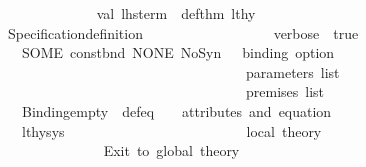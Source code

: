 \begin{isabellebody}
\ \ \ \ \ \ \ \ \ \ \ \ \ \ \isanewline
\ \ \ \ \ \ \ \ \ \ \ \ \ \ val\ {\isacharparenleft}{\kern0pt}{\isacharparenleft}{\kern0pt}lhs{\isacharunderscore}{\kern0pt}term{\isacharcomma}{\kern0pt}\ {\isacharparenleft}{\kern0pt}{\isacharunderscore}{\kern0pt}{\isacharcomma}{\kern0pt}\ def{\isacharunderscore}{\kern0pt}thm{\isacharparenright}{\kern0pt}{\isacharparenright}{\kern0pt}{\isacharcomma}{\kern0pt}\ lthy{\isacharprime}{\kern0pt}{\isacharparenright}{\kern0pt}\ {\isacharequal}{\kern0pt}\ \isanewline
\ \ \ \ \ \ \ \ \ \ \ \ \ \ \ \ Specification{\isachardot}{\kern0pt}definition\isanewline
\ \ \ \ \ \ \ \ \ \ \ \ \ \ \ \ \ \ {\isacharbraceleft}{\kern0pt}verbose\ {\isacharequal}{\kern0pt}\ true{\isacharbraceright}{\kern0pt}\isanewline
\ \ \ \ \ \ \ \ \ \ \ \ \ \ \ \ \ \ {\isacharparenleft}{\kern0pt}SOME\ {\isacharparenleft}{\kern0pt}const{\isacharunderscore}{\kern0pt}bnd{\isacharcomma}{\kern0pt}\ NONE{\isacharcomma}{\kern0pt}\ NoSyn{\isacharparenright}{\kern0pt}{\isacharparenright}{\kern0pt}\ \ {\isacharparenleft}{\kern0pt}{\isacharasterisk}{\kern0pt}\ binding\ option\ {\isacharasterisk}{\kern0pt}{\isacharparenright}{\kern0pt}\isanewline
\ \ \ \ \ \ \ \ \ \ \ \ \ \ \ \ \ \ {\isacharbrackleft}{\kern0pt}{\isacharbrackright}{\kern0pt}\ \ \ \ \ \ \ \ \ \ \ \ \ \ \ \ \ \ \ \ \ \ \ \ \ \ \ \ \ \ \ {\isacharparenleft}{\kern0pt}{\isacharasterisk}{\kern0pt}\ parameters\ list\ {\isacharasterisk}{\kern0pt}{\isacharparenright}{\kern0pt}\isanewline
\ \ \ \ \ \ \ \ \ \ \ \ \ \ \ \ \ \ {\isacharbrackleft}{\kern0pt}{\isacharbrackright}{\kern0pt}\ \ \ \ \ \ \ \ \ \ \ \ \ \ \ \ \ \ \ \ \ \ \ \ \ \ \ \ \ \ \ {\isacharparenleft}{\kern0pt}{\isacharasterisk}{\kern0pt}\ premises\ list\ {\isacharasterisk}{\kern0pt}{\isacharparenright}{\kern0pt}\isanewline
\ \ \ \ \ \ \ \ \ \ \ \ \ \ \ \ \ \ {\isacharparenleft}{\kern0pt}{\isacharparenleft}{\kern0pt}Binding{\isachardot}{\kern0pt}empty{\isacharcomma}{\kern0pt}\ {\isacharbrackleft}{\kern0pt}{\isacharbrackright}{\kern0pt}{\isacharparenright}{\kern0pt}{\isacharcomma}{\kern0pt}\ def{\isacharunderscore}{\kern0pt}eq{\isacharparenright}{\kern0pt}\ \ \ {\isacharparenleft}{\kern0pt}{\isacharasterisk}{\kern0pt}\ attributes\ and\ equation\ {\isacharasterisk}{\kern0pt}{\isacharparenright}{\kern0pt}\isanewline
\ \ \ \ \ \ \ \ \ \ \ \ \ \ \ \ \ \ lthy{\isacharunderscore}{\kern0pt}sys\ \ \ \ \ \ \ \ \ \ \ \ \ \ \ \ \ \ \ \ \ \ \ \ \ {\isacharparenleft}{\kern0pt}{\isacharasterisk}{\kern0pt}\ local\ theory\ {\isacharasterisk}{\kern0pt}{\isacharparenright}{\kern0pt}\isanewline
\ \ \ \ \ \ \ \ \ \ \ \ \ \ \isanewline
\ \ \ \ \ \ \ \ \ \ \ \ \ \ {\isacharparenleft}{\kern0pt}{\isacharasterisk}{\kern0pt}\ Exit\ to\ global\ theory\ {\isacharasterisk}{\kern0pt}{\isacharparenright}{\kern0pt}\isanewline

\end{isabellebody}
